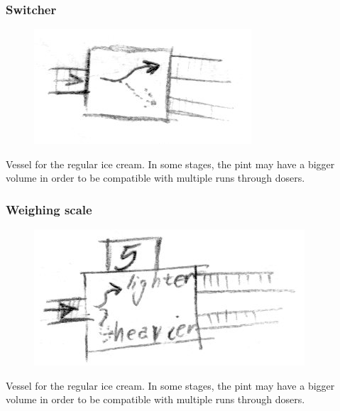 \documentclass[a4paper]{scrartcl}
\begin{document}
        \subsubsection{Switcher}
            \begin{minipage}[t][2em][t]{\textwidth}
                \begin{figure}
                    \vspace{-20pt}
                    \includegraphics[scale=1]{devices/switcher}
                    \vspace{-20pt}
                \end{figure}

                Vessel for the regular ice cream. In some stages, the pint may have
                a bigger volume in order to be compatible with multiple runs through
                dosers.
            \end{minipage}

        \subsubsection{Weighing scale}
            \begin{minipage}[t][3em][t]{\textwidth}
                \begin{figure}
                    \vspace{-20pt}
                    \includegraphics[scale=1]{devices/scale}
                    \vspace{-20pt}
                \end{figure}

                Vessel for the regular ice cream. In some stages, the pint may have
                a bigger volume in order to be compatible with multiple runs through
                dosers.
            \end{minipage}
\end{document}
